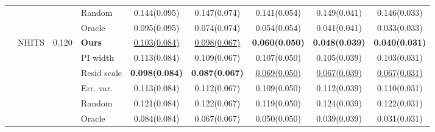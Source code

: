 \begin{table}[t]
\begin{tabular}{@{}llrlccccc@{}}
\cmidrule(lr){4-9}
 &  &  & Random & 0.144(0.095) & 0.147(0.074) & 0.141(0.054) & 0.149(0.041) & 0.146(0.033) \\
 &  &  & Oracle & 0.095(0.095) & 0.074(0.074) & 0.054(0.054) & 0.041(0.041) & 0.033(0.033) \\
\cmidrule(lr){2-9}
 & NHITS & 0.120 & \textbf{Ours} & \underline{0.103(0.084)} & \underline{0.098(0.067)} & \textbf{0.060(0.050)} & \textbf{0.048(0.039)} & \textbf{0.040(0.031)} \\
 &  &  & PI width & 0.113(0.084) & 0.109(0.067) & 0.107(0.050) & 0.105(0.039) & 0.103(0.031) \\
 &  &  & Resid scale & \textbf{0.098(0.084)} & \textbf{0.087(0.067)} & \underline{0.069(0.050)} & \underline{0.067(0.039)} & \underline{0.067(0.031)} \\
 &  &  & Err. var. & 0.113(0.084) & 0.112(0.067) & 0.109(0.050) & 0.112(0.039) & 0.110(0.031) \\
\cmidrule(lr){4-9}
 &  &  & Random & 0.121(0.084) & 0.122(0.067) & 0.119(0.050) & 0.124(0.039) & 0.122(0.031) \\
 &  &  & Oracle & 0.084(0.084) & 0.067(0.067) & 0.050(0.050) & 0.039(0.039) & 0.031(0.031) \\
\bottomrule
\end{tabular}
\end{table}
